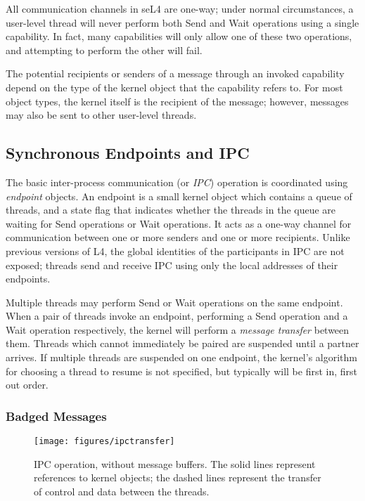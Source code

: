 All communication channels in seL4 are one-way; under normal circumstances, a
user-level thread will never perform both Send and Wait operations using a
single capability. In fact, many capabilities will only allow one of these two
operations, and attempting to perform the other will fail.

The potential recipients or senders of a message through an invoked capability
depend on the type of the kernel object that the capability refers to. For
most object types, the kernel itself is the recipient of the message; however,
messages may also be sent to other user-level threads.

\subsection{Synchronous Endpoints and IPC}\label{sec:overview.caps.ipc}

The basic inter-process communication (or \emph{IPC}) operation is coordinated
using \emph{endpoint} objects. An endpoint is a small kernel object which
contains a queue of threads, and a state flag that indicates whether the
threads in the queue are waiting for Send operations or Wait operations. It
acts as a one-way channel for communication between one or more senders and
one or more recipients. Unlike previous versions of L4, the global identities
of the participants in IPC are not exposed; threads send and receive IPC using
only the local addresses of their endpoints.

Multiple threads may perform Send or Wait operations on the same endpoint.
When a pair of threads invoke an endpoint, performing a Send operation and a
Wait operation respectively, the kernel will perform a \emph{message transfer}
between them. Threads which cannot immediately be paired are suspended until a
partner arrives. If multiple threads are suspended on one endpoint, the
kernel's algorithm for choosing a thread to resume is not specified, but
typically will be first in, first out order.

\subsubsection{Badged Messages}

\begin{figure}
\centering \texttt{[image: figures/ipctransfer]}
\caption{IPC operation, without message buffers. The solid lines represent
references to kernel objects; the dashed lines represent the transfer of
control and data between the threads.}
\label{fig:ipctransfer}
\end{figure}

